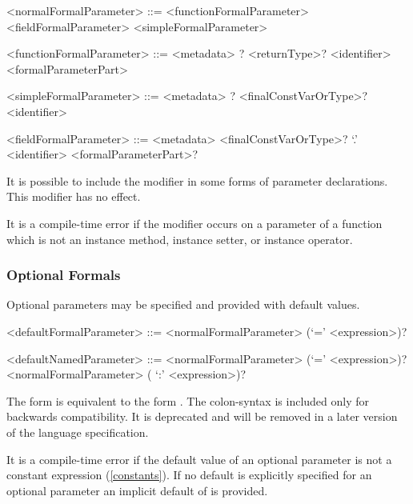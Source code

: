 \documentclass[makeidx]{article}
\begin{document}
\begin{grammar}
<normalFormalParameter> ::= <functionFormalParameter>
  \alt <fieldFormalParameter>
  \alt <simpleFormalParameter>

<functionFormalParameter> ::= \gnewline{}
  <metadata> \COVARIANT{}? <returnType>? <identifier> <formalParameterPart>

<simpleFormalParameter> ::= \gnewline{}
  <metadata> \COVARIANT{}? <finalConstVarOrType>? <identifier>

<fieldFormalParameter> ::= \gnewline{}
  <metadata> <finalConstVarOrType>? \THIS{} `.' <identifier> \gnewline{}
  <formalParameterPart>?
\end{grammar}

\LMHash{}%
It is possible to include the modifier \COVARIANT{} in some forms of parameter declarations.
This modifier has no effect.


\LMHash{}%
It is a compile-time error if the modifier \COVARIANT{} occurs on a parameter of a function which is not an instance method, instance setter, or instance operator.


\subsubsection{Optional Formals}

\LMHash{}%
Optional parameters may be specified and provided with default values.

\begin{grammar}
<defaultFormalParameter> ::= <normalFormalParameter> (`=' <expression>)?

<defaultNamedParameter> ::= <normalFormalParameter> (`=' <expression>)?
  \alt <normalFormalParameter> ( `:' <expression>)?
\end{grammar}

The form 
is equivalent to the form
.
The colon-syntax is included only for backwards compatibility.
It is deprecated and will be removed in a later version of the language specification.

\LMHash{}%
It is a compile-time error if the default value of an optional parameter is not a constant expression (\ref{constants}).
If no default is explicitly specified for an optional parameter an implicit default of \NULL{} is provided.
\end{document}
